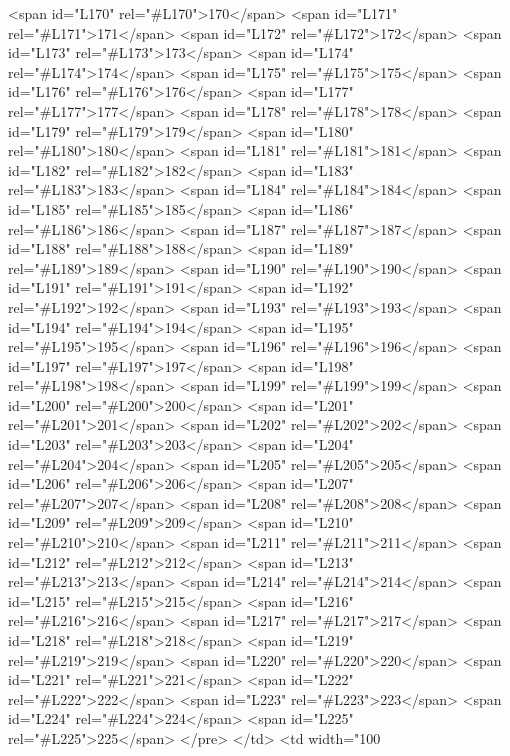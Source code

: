 <span id="L170" rel="#L170">170</span>
<span id="L171" rel="#L171">171</span>
<span id="L172" rel="#L172">172</span>
<span id="L173" rel="#L173">173</span>
<span id="L174" rel="#L174">174</span>
<span id="L175" rel="#L175">175</span>
<span id="L176" rel="#L176">176</span>
<span id="L177" rel="#L177">177</span>
<span id="L178" rel="#L178">178</span>
<span id="L179" rel="#L179">179</span>
<span id="L180" rel="#L180">180</span>
<span id="L181" rel="#L181">181</span>
<span id="L182" rel="#L182">182</span>
<span id="L183" rel="#L183">183</span>
<span id="L184" rel="#L184">184</span>
<span id="L185" rel="#L185">185</span>
<span id="L186" rel="#L186">186</span>
<span id="L187" rel="#L187">187</span>
<span id="L188" rel="#L188">188</span>
<span id="L189" rel="#L189">189</span>
<span id="L190" rel="#L190">190</span>
<span id="L191" rel="#L191">191</span>
<span id="L192" rel="#L192">192</span>
<span id="L193" rel="#L193">193</span>
<span id="L194" rel="#L194">194</span>
<span id="L195" rel="#L195">195</span>
<span id="L196" rel="#L196">196</span>
<span id="L197" rel="#L197">197</span>
<span id="L198" rel="#L198">198</span>
<span id="L199" rel="#L199">199</span>
<span id="L200" rel="#L200">200</span>
<span id="L201" rel="#L201">201</span>
<span id="L202" rel="#L202">202</span>
<span id="L203" rel="#L203">203</span>
<span id="L204" rel="#L204">204</span>
<span id="L205" rel="#L205">205</span>
<span id="L206" rel="#L206">206</span>
<span id="L207" rel="#L207">207</span>
<span id="L208" rel="#L208">208</span>
<span id="L209" rel="#L209">209</span>
<span id="L210" rel="#L210">210</span>
<span id="L211" rel="#L211">211</span>
<span id="L212" rel="#L212">212</span>
<span id="L213" rel="#L213">213</span>
<span id="L214" rel="#L214">214</span>
<span id="L215" rel="#L215">215</span>
<span id="L216" rel="#L216">216</span>
<span id="L217" rel="#L217">217</span>
<span id="L218" rel="#L218">218</span>
<span id="L219" rel="#L219">219</span>
<span id="L220" rel="#L220">220</span>
<span id="L221" rel="#L221">221</span>
<span id="L222" rel="#L222">222</span>
<span id="L223" rel="#L223">223</span>
<span id="L224" rel="#L224">224</span>
<span id="L225" rel="#L225">225</span>
</pre>
          </td>
          <td width="100%
